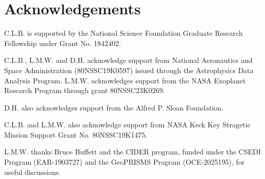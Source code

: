 \documentclass[twocolumn]{aastex631}
\begin{document}


\section{Acknowledgements}

C.L.B. is supported by the National Science Foundation Graduate Research Fellowship under Grant No. 1842402.

C.L.B., L.M.W. and D.H. acknowledge support from National Aeronautics and Space Administration (80NSSC19K0597) issued through the Astrophysics Data Analysis Program. L.M.W. acknowledges support from the NASA Exoplanet Research Program through grant 80NSSC23K0269.

D.H. also acknowledges support from the Alfred P. Sloan Foundation.

C.L.B. and L.M.W. also acknowledge support from NASA Keck Key Stragetic Mission Support Grant No. 80NSSC19K1475.

L.M.W. thanks Bruce Buffett and the CIDER program, funded under the CSEDI Program (EAR-1903727) and the GeoPRISMS Program (OCE-2025195), for useful discussions.






%

\end{document}
